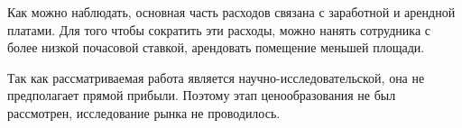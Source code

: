 \vspace{2em}

Как можно наблюдать, основная часть расходов связана с заработной и
арендной платами. Для того чтобы сократить эти расходы, можно нанять
сотрудника с более низкой почасовой ставкой, арендовать помещение
меньшей площади.

Так как рассматриваемая работа является научно-исследовательской,
она не предполагает прямой прибыли. Поэтому этап ценообразования не был
рассмотрен, исследование рынка не проводилось.
